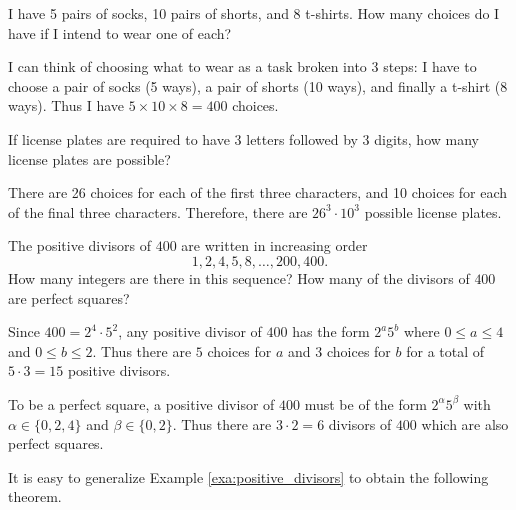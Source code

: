 \begin{exa}
I have 5 pairs of socks, 10 pairs of shorts, and 8 t-shirts.  How many choices do I
have if I intend to wear one of each?
\begin{sol}
I can think of choosing what to wear as a task broken into 3 steps:
I have to choose a pair of socks (5 ways), a pair of shorts (10 ways), and finally a t-shirt 
(8 ways).  Thus I have $5\times 10\times 8= 400$ choices.
\end{sol}
\end{exa}


\begin{exer}
If license plates are required to have 3 letters followed by 3 digits, 
how many license plates are possible?

\noindent
\answerline
\begin{answer}
There are 26 choices for each of the first three characters, 
and 10 choices for each of the final three characters.  
Therefore, there are $26^3\cdot10^3$ possible license plates.
\end{answer}
\end{exer}


\begin{exa}\label{exa:positive_divisors}
The positive divisors of $400$ are written in increasing order
$$1,2,4,5,8, \ldots, 200, 400.
$$
How many integers are there in this sequence? 
How many of the divisors of $400$ are perfect squares?
\begin{sol} Since $400 = 2^4 \cdot 5^2$, any positive divisor of $400$
has the form $2^a5^b$ where $0 \leq a \leq 4$ and $0\leq b \leq 2$.
Thus there are $5$ choices for $a$ and $3$ choices for $b$ for a
total of $5\cdot 3 = 15$ positive divisors.

To be a perfect square, a positive divisor of $400$ must be of the
form $2^\alpha 5^\beta$ with $\alpha \in \{0, 2, 4\}$ and $\beta \in
\{0, 2\}$. Thus there are $3\cdot 2 = 6$ divisors of $400$ which are
also perfect squares.
\end{sol}
\end{exa}

It is easy to generalize Example \ref{exa:positive_divisors} 
to obtain the following theorem.

